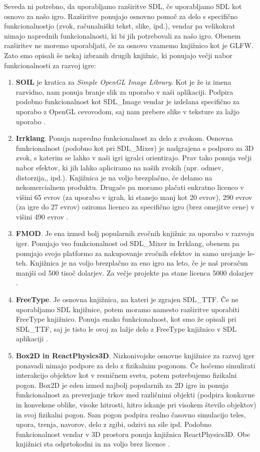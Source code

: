 \documentclass[12pt,a4paper,twoside]{book}
\begin{document}
Seveda ni potrebno, da uporabljamo razširitve SDL, če uporabljamo SDL kot osnovo za našo igro. Razširitve ponujajo osnovno pomoč za delo s specifično funkcionalnostjo (zvok, računalniški tekst, slike, ipd.), vendar pa velikokrat nimajo naprednih funkcionalnosti, ki bi jih potrebovali za našo igro. Obenem razširitev ne moremo uporabljati, če za osnovo vzamemo knjižnico kot je GLFW. Zato smo opisali še nekaj izbranih drugih knjižnic, ki ponujajo večji nabor funkcionalnosti za razvoj igre:
\begin{enumerate}
	\item \textbf{SOIL} je kratica za \textit{Simple OpenGL Image Library}. Kot je že iz imena razvidno, nam ponuja branje slik za uporabo v naši aplikaciji. Podpira podobno funkcionalnost kot SDL\_Image vendar je izdelana specifično za uporabo z OpenGL cevovodom, saj nam prebere slike v teksture za lažjo uporabo \cite{soil}.
	\item \textbf{Irrklang}. Ponuja napredno funkcionalnost za delo z zvokom. Osnovna funkcionalnost (podobno kot pri SDL\_Mixer) je nadgrajena s podporo za 3D zvok, s katerim se lahko v naši igri igralci orientirajo. Prav tako ponuja večji nabor efektov, ki jih lahko apliciramo na naših zvokih (npr. odmev, distorzija,, ipd.). Knjižnica je na voljo brezplačno, če delamo na nekomercialnem produktu. Drugače pa moramo plačati enkratno licenco v višini 65 evrov (za uporabo v igrah, ki stanejo manj kot 20 evrov), 290 evrov (za igre do 27 evrov) oziroma licenco za specifično igro (brez omejitve cene) v višini 490 evrov \cite{irrklang}. 
	\item \textbf{FMOD}. Je ena izmed bolj popularnih zvočnih knjižnic za uporabo v razvoju iger. Ponujajo vso funkcionalnost od SDL\_Mixer in Irrklang, obenem pa ponujajo svojo platformo za nakupovanje zvočnih efektov in samo urejanje le-teh. Knjižnica je na voljo brezplačno za eno igro na leto, če je naš proračun manjši od 500 tisoč dolarjev. Za večje projekte pa stane licenca 5000 dolarjev \cite{fmod}.
	\item \textbf{FreeType}. Je osnovna knjižnica, na kateri je zgrajen SDL\_TTF. Če ne uporabljamo SDL knjižnice, potem moramo namesto razširitve uporabiti FreeType knjižnico. Ponuja enako funkcionalnost, kot smo že opisali pri SDL\_TTF, saj je tisto le ovoj za lažje delo z FreeType knjižnico v SDL aplikaciji \cite{freetype}.
	\item \textbf{Box2D in ReactPhysics3D}. Nizkonivojske osnovne knjižnice za razvoj iger ponavadi nimajo podpore za delo z fizikalnim pogonom. Če hočemo simulirati interakcijo objektov kot v resničnem svetu, potem potrebujemo fizikalni pogon. Box2D je eden izmed najbolj popularnih za 2D igre in ponuja funkcionalnost za preverjanje trkov med različnimi objekti (podpira konkavne in konveksne oblike, visoke hitrosti, hitro iskanje pri visokem število objektov) in svoj fizikalni pogon. Sam pogon podpira realno časovno simulacijo teles, upora, trenja, navorov, delo z zgibi, odzivi na sile ipd. Podobno funkcionalnost vendar v 3D prostoru ponuja knjižnica ReactPhysics3D. Obe knjižnici sta odprtokodni in na voljo brez licence \cite{box2d} \cite{reactPhysics3d}.
\end{enumerate}
\end{document}
